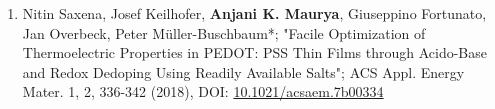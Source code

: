 \begin{enumerate}[itemsep=0pt,parsep=10pt]

\item Nitin Saxena, Josef Keilhofer, \textbf{Anjani K. Maurya}, Giuseppino Fortunato, Jan Overbeck, Peter Müller-Buschbaum*; "Facile Optimization of Thermoelectric Properties in PEDOT: PSS Thin Films through Acido-Base and Redox Dedoping Using Readily Available Salts"; ACS Appl. Energy Mater. 1, 2, 336-342 (2018), DOI: \textcolor{cyan}{\href{https://pubs.acs.org/doi/10.1021/acsaem.7b00334}{10.1021/acsaem.7b00334}}
	
\end{enumerate}